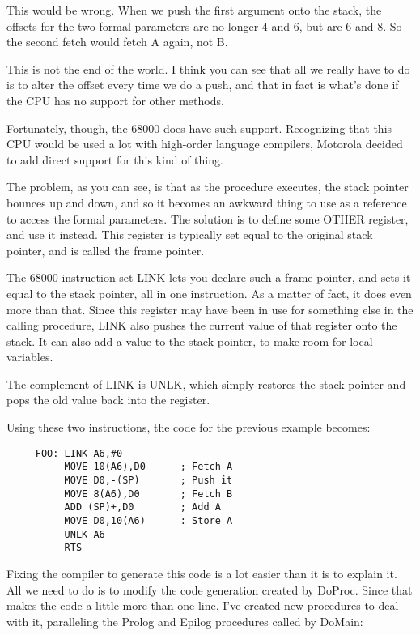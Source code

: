 This  would  be  wrong. When we push the first argument onto the stack, the offsets for the two formal parameters are no  longer 4 and 6, but are 6 and 8. So the second fetch would fetch A again, not B.

This is not  the  end of the world. I think you can see that all we really have to do is to alter the offset every  time  we  do a push, and that in fact is what's done if the  CPU  has no support for other methods.

Fortunately, though, the   68000   does  have  such  support. Recognizing that this CPU  would  be  used  a lot with high-order language compilers, Motorola decided to  add  direct  support for this kind of thing.

The problem, as you  can  see, is that as the procedure executes, the stack  pointer  bounces  up  and  down, and so it becomes an awkward  thing  to  use  as  a  reference  to access  the  formal parameters. The solution is to define some  OTHER  register, and use  it instead. This register is typically  set  equal  to  the original stack pointer, and is called the frame pointer.

The  68000 instruction set LINK lets you  declare  such  a  frame pointer, and  sets  it  equal  to  the  stack pointer, all in one instruction. As a matter of  fact, it does even more than that. Since this register may have been in use for  something  else  in the calling procedure, LINK also pushes the current value of that register onto the stack. It  can  also  add a value to the stack pointer, to make room for local variables.

The complement of LINK is UNLK, which simply  restores  the stack pointer and pops the old value back into the register.

Using these two  instructions, the code for the previous example becomes:

\begin{verbatim}
     FOO: LINK A6,#0
          MOVE 10(A6),D0      ; Fetch A
          MOVE D0,-(SP)       ; Push it
          MOVE 8(A6),D0       ; Fetch B
          ADD (SP)+,D0        ; Add A
          MOVE D0,10(A6)      : Store A
          UNLK A6
          RTS
\end{verbatim}

Fixing the compiler to generate this code is a lot easier than it is  to  explain  it. All we need to do is to modify  the  code generation created by DoProc. Since that makes the code a little more than one line, I've created new procedures to deal  with it, paralleling the Prolog and Epilog procedures called by DoMain:

